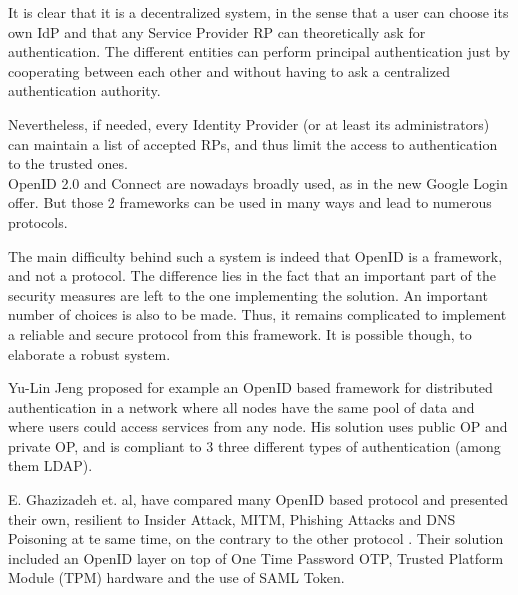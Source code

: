 
It is clear that it is a decentralized system, in the sense that a user can choose its own IdP and that any Service Provider RP can theoretically ask for authentication. The different entities can perform principal authentication just by cooperating between each other and without having to ask a centralized authentication authority. 

Nevertheless, if needed, every Identity Provider (or at least its administrators) can maintain a list of accepted RPs, and thus limit the access to authentication to the trusted ones.
\\

OpenID 2.0 and Connect are nowadays broadly used, as in the new Google Login offer. But those 2 frameworks can be used in many ways and lead to numerous protocols.

The main difficulty behind such a system is indeed that OpenID is a framework, and not a protocol. The difference lies in the fact that an important part of the security measures are left to the one implementing the solution. An important number of choices is also to be made. Thus, it remains complicated to implement a reliable and secure protocol from this framework. It is possible though, to elaborate a robust system. 

Yu-Lin Jeng proposed for example an OpenID based framework for distributed authentication in a network where all nodes have the same pool of data and where users could access services from any node. His solution uses public OP and private OP, and is compliant to 3 three different types of authentication (among them LDAP)\cite{Jeng2012}.

E. Ghazizadeh et. al, have compared many OpenID based protocol and presented their own, resilient to Insider Attack, MITM, Phishing Attacks and DNS Poisoning at te same time, on the contrary to the other protocol \cite{Ghazizadeh}. Their solution included an OpenID layer on top of One Time Password OTP, Trusted Platform Module (TPM) hardware and the use of  SAML Token.

